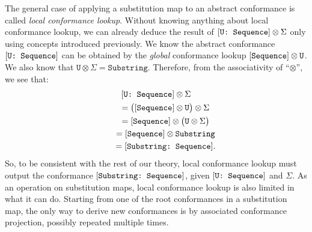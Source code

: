\documentclass[../generics]{subfiles}
\begin{document}
The general case of applying a substitution map to an abstract conformance is called \emph{local conformance lookup}. Without knowing anything about local conformance lookup, we can already deduce the result of $[\texttt{U:~Sequence}]\otimes \Sigma$ only using concepts introduced previously. We know the abstract conformance $[\texttt{U:~Sequence}]$ can be obtained by the \emph{global} conformance lookup $[\texttt{Sequence}]\otimes\texttt{U}$. We also know that $\texttt{U}\otimes \Sigma=\texttt{Substring}$. Therefore, from the associativity of ``$\otimes$'', we see that:
\begin{gather*}
[\texttt{U:~Sequence}]\otimes \Sigma\\
\qquad {} = \bigl([\texttt{Sequence}]\otimes\texttt{U}\bigr)\otimes \Sigma\\
\qquad {} = [\texttt{Sequence}]\otimes\bigl(\texttt{U}\otimes \Sigma\bigr)\\
\qquad {} = [\texttt{Sequence}]\otimes\texttt{Substring}\\
\qquad {} = [\texttt{Substring:~Sequence}].
\end{gather*}
So, to be consistent with the rest of our theory, local conformance lookup must output the conformance $[\texttt{Substring:~Sequence}]$, given $[\texttt{U:~Sequence}]$ and $\Sigma$. As an operation on substitution maps, local conformance lookup is also limited in what it can do. Starting from one of the root conformances in a substitution map, the only way to derive new conformances is by associated conformance projection, possibly repeated multiple times.
\end{document}
